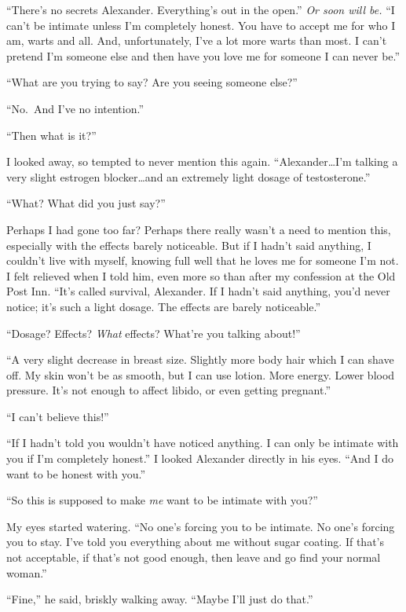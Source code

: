 ``There's no secrets Alexander. Everything's out in the open.'' \emph{Or
soon will be.} ``I can't be intimate unless I'm completely honest. You
have to accept me for who I am, warts and all. And, unfortunately, I've
a lot more warts than most. I can't pretend I'm someone else and then
have you love me for someone I can never be.''

``What are you trying to say? Are you seeing someone else?''

``No.~And I've no intention.''

``Then what is it?''

I looked away, so tempted to never mention this again.
``Alexander\ldots I'm talking a very slight estrogen blocker\ldots and
an extremely light dosage of testosterone.''

``What? What did you just say?''

Perhaps I had gone too far? Perhaps there really wasn't a need to
mention this, especially with the effects barely noticeable. But if I
hadn't said anything, I couldn't live with myself, knowing full well
that he loves me for someone I'm not. I felt relieved when I told him,
even more so than after my confession at the Old Post Inn. ``It's called
survival, Alexander. If I hadn't said anything, you'd never notice; it's
such a light dosage. The effects are barely noticeable.''

``Dosage? Effects? \emph{What} effects? What're you talking about!''

``A very slight decrease in breast size. Slightly more body hair which I
can shave off. My skin won't be as smooth, but I can use lotion. More
energy. Lower blood pressure. It's not enough to affect libido, or even
getting pregnant.''

``I can't believe this!''

``If I hadn't told you wouldn't have noticed anything. I can only be
intimate with you if I'm completely honest.'' I looked Alexander
directly in his eyes. ``And I do want to be honest with you.''

``So this is supposed to make \emph{me} want to be intimate with you?''

My eyes started watering. ``No one's forcing you to be intimate. No
one's forcing you to stay. I've told you everything about me without
sugar coating. If that's not acceptable, if that's not good enough, then
leave and go find your normal woman.''

``Fine,'' he said, briskly walking away. ``Maybe I'll just do that.''

